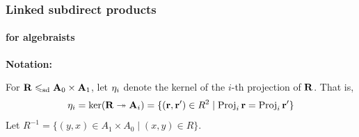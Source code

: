 \documentclass[9pt,xcolor=dvipsnames%
   ]{beamer}
\begin{document}
\begin{frame}
  \frametitle{Linked subdirect products}
  \framesubtitle{for algebraists}
  {\bf Notation:}

  \medskip
  For $\mathbf{R} \leqslant_{\mathrm{sd}} \mathbf{A}_0 \times \mathbf{A}_1$, let $\eta_i$ denote the kernel of the
  $i$-th projection of $\mathbf{R}$. That is,
  \[
  \eta_i = \ker(\mathbf{R} \twoheadrightarrow \mathbf{A}_i) = \{(\mathbf{r}, \mathbf{r}')\in R^2 \mid \operatorname{Proj}_i \mathbf{r} =
  \operatorname{Proj}_i \mathbf{r}'\}
  \]
  Let $R^{-1} = \{(y,x) \in A_1 \times A_0 \mid (x,y) \in R\}$.

  \bigskip

  \bigskip


\end{frame}
\end{document}
